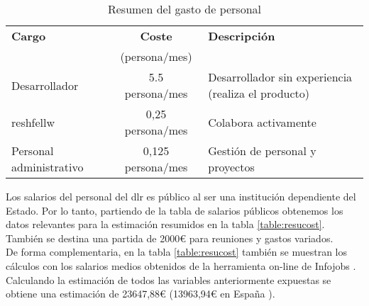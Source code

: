 \begin{center}
\begin {table}[H]
    \begin{tabular}{ | l | c | p{6.5cm} |}
    \hline
    \textbf{Cargo} & \textbf{Coste} & \textbf{Descripción} \\
    				& (persona/mes) &                      \\ \hline
    Desarrollador & 5.5 persona/mes & Desarrollador sin experiencia (realiza el producto)\\ \hline
    \gls{reshfellw} & 0,25 persona/mes& Colabora activamente \\ \hline
    Personal administrativo  & 0,125 persona/mes& Gestión de personal y proyectos \\ \hline
    \end{tabular}
    \caption{Resumen del gasto de personal}
    \label{table:salmes}
  \end{table}
\end{center}

Los salarios del personal del \gls{dlr} es público al ser una institución dependiente del Estado. Por lo tanto, partiendo de la tabla de salarios públicos \cite{tvod} obtenemos los datos relevantes para la estimación resumidos en la tabla \ref{table:resucost}. También se destina una partida de 2000\euro{} para reuniones y gastos variados.\\

De forma complementaria, en la tabla \ref{table:resucost} también se muestran los cálculos con los salarios medios obtenidos de la herramienta on-line de Infojobs \cite{infojobs}.\\

Calculando la estimación de todos las variables anteriormente expuestas se obtiene una estimación de 23647,88\euro{}  (13963,94\euro{} en España ).

